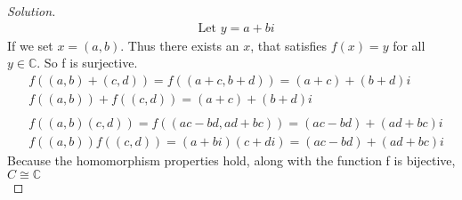 \documentclass[12pt]{article}
\begin{document}
\begin{enumerate}[label = (\alph*)]
\begin{proof}[Solution]
			\begin{align*}
				&\text{Let } y = a + bi
			\end{align*}
			If we set $x = (a,b)$.  Thus there exists an $x$, that satisfies $f(x) = y$ for all $y \in \mathbb{C}$.  So f is surjective.
			\begin{align*}
				&f((a,b)+(c,d)) = f((a+c,b+d)) = (a+c) + (b+d)i \\
				&f((a,b)) + f((c,d)) = (a+c) + (b+d)i \\ \\
				&f((a,b)(c,d)) = f((ac - bd, ad + bc)) = (ac-bd) + (ad + bc)i \\
				&f((a,b))f((c,d)) = (a+bi)(c+di) = (ac-bd) + (ad + bc)i
			\end{align*}
			Because the homomorphism properties hold, along with the function f is bijective, $C \cong \mathbb{C}$ \\
		\end{proof}
	\end{enumerate}
\end{document}
